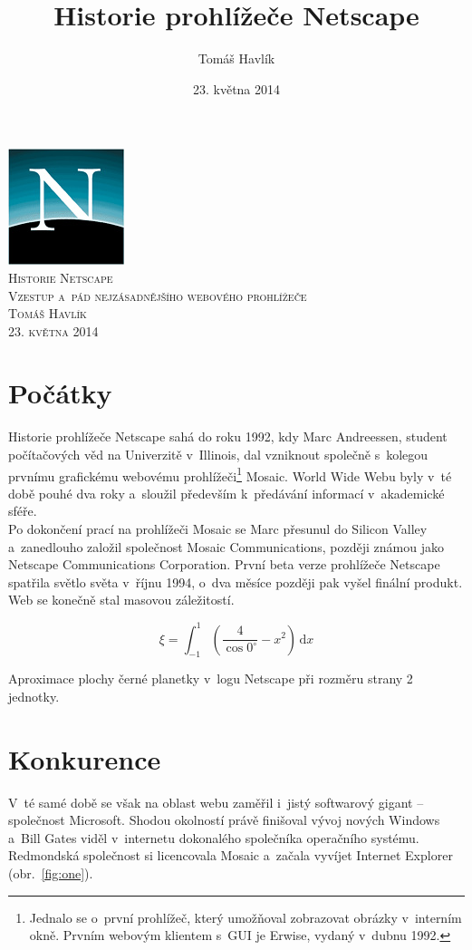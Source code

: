 \documentclass[a4paper, 11pt]{scrartcl}
\title{Historie prohlížeče Netscape}
\date{23. května 2014}
\author{Tomáš Havlík}
\begin{document}
\begin{titlepage}
\begin{center}
\includegraphics[scale=0.75]{ntsc_logo.png}~\\[1cm]
\textsc{\LARGE Historie Netscape}\\[0.5cm]
\textsc{\Large Vzestup a~pád nejzásadnějšího webového prohlížeče}\\[1cm]
\textsc{Tomáš Havlík\\23. května 2014}
\end{center}
\end{titlepage}

\newpage


\section{Počátky}
Historie prohlížeče Netscape sahá do roku 1992, kdy Marc Andreessen, student počítačových věd na Univerzitě v~Illinois, dal vzniknout společně s~kolegou prvnímu graf\/ickému webovému prohlížeči\footnote{Jednalo se o~první prohlížeč, který umožňoval zobrazovat obrázky v~interním okně. Prvním webovým klientem s~GUI je Erwise, vydaný v~dubnu 1992.} Mosaic. World Wide Webu byly v~té době pouhé dva roky a~sloužil především k~předávání informací v~akademické sféře.\\
Po dokončení prací na prohlížeči Mosaic se Marc přesunul do Silicon Valley a~zanedlouho založil společnost Mosaic Communications, později známou jako Netscape Communications Corporation. První beta verze prohlížeče Netscape spatřila světlo světa v~říjnu 1994, o~dva měsíce později pak vyšel finální produkt. Web se konečně stal masovou záležitostí.

\begin{ntscarea}[ht]
\begin{equation}
\xi = \int_{-1}^1 \! \left(\frac{4}{\cos 0^\circ}-x^2\right) \, \mathrm{d}x
\end{equation}
\caption{Aproximace plochy černé planetky v~logu Netscape při rozměru strany 2 jednotky.}
\end{ntscarea}


\section{Konkurence}
V~té samé době se však na oblast webu zaměřil i~jistý softwarový gigant – společnost Microsoft. Shodou okolností právě f\/inišoval vývoj nových Windows a~Bill Gates viděl v~internetu dokonalého společníka operačního systému. Redmondská společnost si licencovala Mosaic a~začala vyvíjet Internet Explorer (obr.~\ref{fig:one}).
\end{document}
